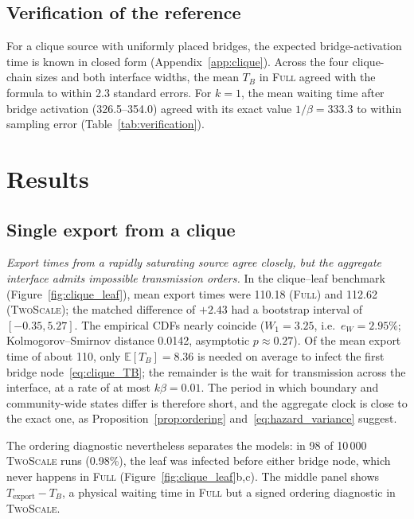 \documentclass[a4paper,fleqn]{cas-sc}
\newcommand{\Full}{\textup{\textsc{Full}}}
\newcommand{\TS}{\textup{\textsc{TwoScale}}}
\newcommand{\eW}{e_{W}}
\begin{document}
\subsection{Verification of the reference}

For a clique source with uniformly placed bridges, the expected bridge-activation time is known in closed form (Appendix~\ref{app:clique}). Across the four clique-chain sizes and both interface widths, the mean $T_B$ in \Full{} agreed with the formula to within 2.3 standard errors. For $k=1$, the mean waiting time after bridge activation (326.5--354.0) agreed with its exact value $1/\beta=333.3$ to within sampling error (Table~\ref{tab:verification}).

\section{Results}
\label{sec:results}

\subsection{Single export from a clique}
\label{sec:res_clique}

\emph{Export times from a rapidly saturating source agree closely, but the aggregate interface admits impossible transmission orders.} In the clique--leaf benchmark (Figure~\ref{fig:clique_leaf}), mean export times were 110.18 (\Full{}) and 112.62 (\TS{}); the matched difference of $+2.43$ had a bootstrap interval of $[-0.35,5.27]$. The empirical CDFs nearly coincide ($W_1=3.25$, i.e.\ $\eW=2.95\%$; Kolmogorov--Smirnov distance 0.0142, asymptotic $p\approx0.27$). Of the mean export time of about 110, only $\mathbb{E}[T_B]=8.36$ is needed on average to infect the first bridge node~\eqref{eq:clique_TB}; the remainder is the wait for transmission across the interface, at a rate of at most $k\beta=0.01$. The period in which boundary and community-wide states differ is therefore short, and the aggregate clock is close to the exact one, as Proposition~\ref{prop:ordering} and~\eqref{eq:hazard_variance} suggest.

The ordering diagnostic nevertheless separates the models: in 98 of 10\,000 \TS{} runs (0.98\%), the leaf was infected before either bridge node, which never happens in \Full{} (Figure~\ref{fig:clique_leaf}b,c). The middle panel shows $T_{\mathrm{export}}-T_B$, a physical waiting time in \Full{} but a signed ordering diagnostic in \TS{}.
\end{document}
